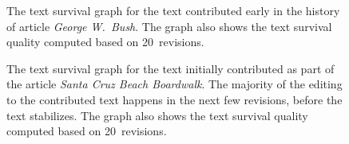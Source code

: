 \begin{figure}[tbph]
\centering
{}
\caption{The text survival graph for the text contributed early
        in the history of article \textit{George W.~Bush}.
	The graph also shows the text survival quality
	computed based on 20~revisions.
	}
\label{fig:ts-GeorgeWBush}
\end{figure}

\begin{figure}[tbph]
\centering
{}
\caption{The text survival graph for the text initially contributed
	as part of the article \textit{Santa Cruz Beach Boardwalk}.
	The majority of the editing to the contributed text happens
	in the next few revisions, before the text stabilizes.
	The graph also shows the text survival quality
	computed based on 20~revisions.
	}
\label{fig:ts-SantaCruzBeachBoardwalk}
\end{figure}


